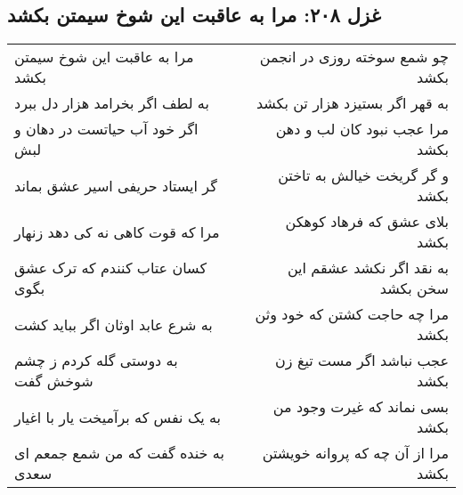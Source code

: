 \begin{center}
\section*{غزل ۲۰۸: مرا به عاقبت این شوخ سیمتن بکشد}
\label{sec:208}
\begin{longtable}{l p{0.5cm} r}
مرا به عاقبت این شوخ سیمتن بکشد
&&
چو شمع سوخته روزی در انجمن بکشد
\\
به لطف اگر بخرامد هزار دل ببرد
&&
به قهر اگر بستیزد هزار تن بکشد
\\
اگر خود آب حیاتست در دهان و لبش
&&
مرا عجب نبود کان لب و دهن بکشد
\\
گر ایستاد حریفی اسیر عشق بماند
&&
و گر گریخت خیالش به تاختن بکشد
\\
مرا که قوت کاهی نه کی دهد زنهار
&&
بلای عشق که فرهاد کوهکن بکشد
\\
کسان عتاب کنندم که ترک عشق بگوی
&&
به نقد اگر نکشد عشقم این سخن بکشد
\\
به شرع عابد اوثان اگر بباید کشت
&&
مرا چه حاجت کشتن که خود وثن بکشد
\\
به دوستی گله کردم ز چشم شوخش گفت
&&
عجب نباشد اگر مست تیغ زن بکشد
\\
به یک نفس که برآمیخت یار با اغیار
&&
بسی نماند که غیرت وجود من بکشد
\\
به خنده گفت که من شمع جمعم ای سعدی
&&
مرا از آن چه که پروانه خویشتن بکشد
\\
\end{longtable}
\end{center}
